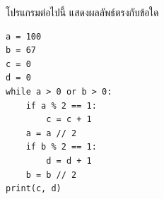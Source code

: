 \question โปรแกรมต่อไปนี้ แสดงผลลัพธ์ตรงกับข้อใด
\begin{verbatim}
a = 100
b = 67 
c = 0
d = 0
while a > 0 or b > 0:
    if a % 2 == 1:
        c = c + 1
    a = a // 2
    if b % 2 == 1:
        d = d + 1
    b = b // 2
print(c, d)
\end{verbatim}
